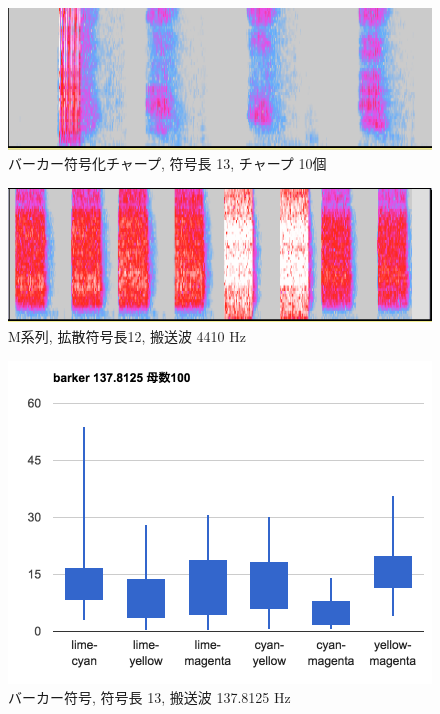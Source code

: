 \begin{figure}[p]
  \centering
  \includegraphics[clip,width=1.05\hsize]{img/barkerCodedChirp_10.png}
  \caption{バーカー符号化チャープ, 符号長 13, チャープ 10個}\label{fig:barkerCodedChirpZ10}
\end{figure}

\begin{figure}[p]
  \centering
  \includegraphics[clip,width=1.05\hsize]{img/mseq_12_4410.png}
  \caption{M系列, 拡散符号長12, 搬送波 4410 Hz}\label{fig:mseqZ12Z4410}
\end{figure}




\clearpage




\begin{figure}[p]
  \centering
  \includegraphics[clip,width=1.05\hsize]{img/b137.png}
  \caption{バーカー符号, 符号長 13, 搬送波 137.8125 Hz}\label{fig:b137}
\end{figure}

